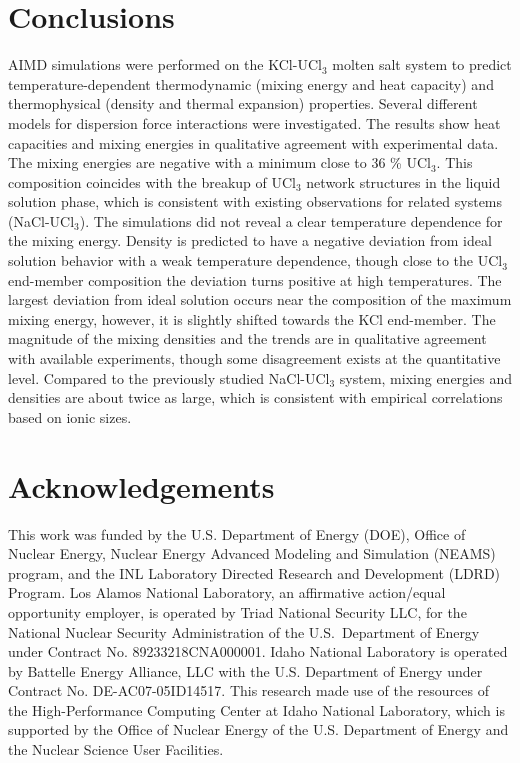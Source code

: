 \documentclass[preprint,3p,10pt,number,sort&compress]{elsarticle}
\begin{document}
\section{Conclusions}
\label{sec:conclusions}
AIMD simulations were performed on the KCl-UCl$_3$ molten salt system to predict temperature-dependent thermodynamic (mixing energy and heat capacity) and thermophysical (density and thermal expansion) properties. Several different models for dispersion force interactions were investigated. The results show heat capacities and mixing energies in qualitative agreement with experimental data. The mixing energies are negative with a minimum close to 36 \% UCl$_3$. This composition coincides with the breakup of UCl$_3$ network structures in the liquid solution phase, which is consistent with existing observations for related systems (NaCl-UCl$_3$). The simulations did not reveal a clear temperature dependence for the mixing energy. Density is predicted to have a negative deviation from ideal solution behavior with a weak temperature dependence, though close to the UCl$_3$ end-member composition the deviation turns positive at high temperatures. The largest deviation from ideal solution occurs near the composition of the maximum mixing energy, however, it is slightly shifted towards the KCl end-member. The magnitude of the mixing densities and the trends are in qualitative agreement with available experiments, though some disagreement exists at the quantitative level. Compared to the previously studied NaCl-UCl$_3$ system, mixing energies and densities are about twice as large, which is consistent with empirical correlations based on ionic sizes. 


\section*{Acknowledgements}
This work was funded by the U.S. Department of Energy (DOE), Office of Nuclear Energy, Nuclear Energy Advanced Modeling and Simulation (NEAMS) program, and the INL Laboratory Directed Research and Development (LDRD) Program. Los Alamos National Laboratory, an affirmative action/equal opportunity employer, is operated by Triad National Security LLC, for the National Nuclear Security Administration of the U.S.\ Department of Energy under Contract No. 89233218CNA000001. Idaho National Laboratory is operated by Battelle Energy Alliance, LLC with the U.S. Department of Energy under Contract No. DE-AC07-05ID14517. This research made use of the resources of the High-Performance Computing Center at Idaho National Laboratory, which is supported by the Office of Nuclear Energy of the U.S. Department of Energy and the Nuclear Science User Facilities.       


 

\end{document}
